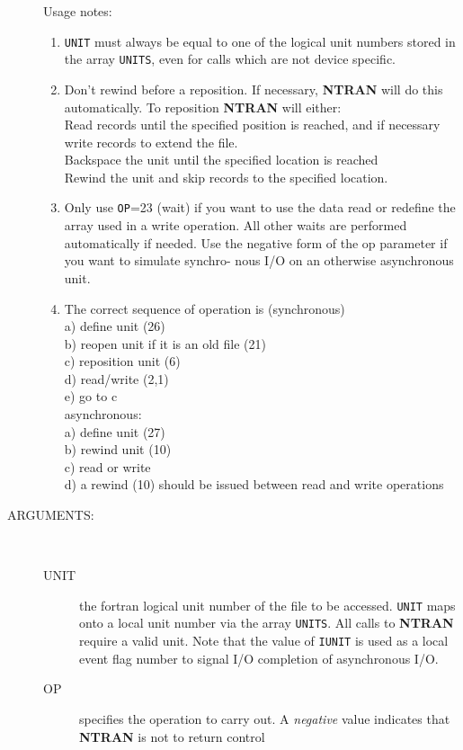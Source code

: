 \begin{description}
Usage notes:
\begin{enumerate}
\item  {\tt UNIT} must always be equal to one of the 
logical unit numbers stored
in the array {\tt UNITS}, even for calls which are not device specific.
\item  Don't rewind before a reposition. If necessary, 
{\bf NTRAN} will do this
automatically. To reposition {\bf NTRAN} will either: \\
Read records until the specified position is reached, and if
necessary write records to extend the file. \\
Backspace the unit until the specified location is reached \\
Rewind the unit and skip records to the specified location.
\item Only use {\tt OP}=23 (wait) if you want to use the  data read or
redefine the array used in a write operation. All other
waits are performed automatically if needed. Use the negative
form of the op parameter if you want to simulate synchro-
nous I/O on an otherwise asynchronous unit.
\item The correct sequence of operation is (synchronous) \\
a) define unit (26) \\
b) reopen unit if it is an old file (21) \\
c) reposition unit (6) \\
d) read/write (2,1) \\
e) go to c \\
asynchronous: \\
a) define unit (27) \\
b) rewind unit (10) \\
c) read or write \\
d) a rewind (10)  should be issued
between read and write operations
\end{enumerate}
\item[ARGUMENTS:] \ \\
\begin{description}
\item[UNIT]  the fortran logical unit number of the file to be
accessed.  {\tt UNIT} maps onto a local unit number
via the array {\tt UNITS}.  All calls to {\bf NTRAN}
require a valid unit.  Note that the value of {\tt IUNIT}
is used as a local event flag number to signal
I/O completion of asynchronous I/O.
\item[OP] specifies the operation to carry out. A {\em negative}
value indicates that {\bf NTRAN} is not to return control

\end{description}
\end{description}
